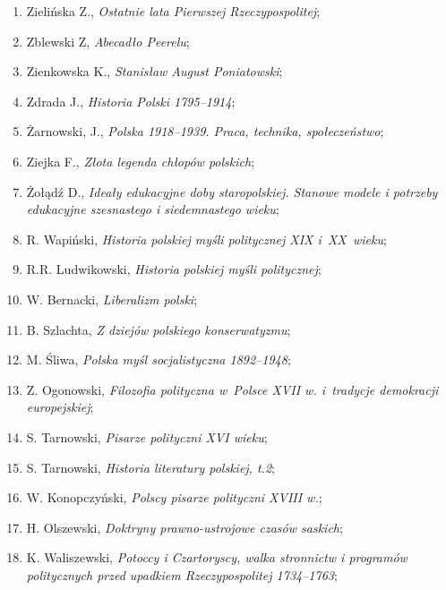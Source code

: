 \documentclass[a4paper,11pt]{article}
\begin{document}
\begin{enumerate}
\item Zielińska Z., \textit{Ostatnie lata Pierwszej Rzeczypospolitej};

\item Zblewski Z, \textit{Abecadło Peerelu};

\item Zienkowska K., \textit{Stanisław August Poniatowski};

\item Zdrada J., \textit{Historia Polski 1795--1914};

\item Żarnowski, J., \textit{Polska 1918--1939. Praca, technika,
    społeczeństwo};

\item Ziejka F., \textit{Złota legenda chłopów polskich};

\item Żołądź D., \textit{Ideały edukacyjne doby staropolskiej. Stanowe
    modele i potrzeby edukacyjne szesnastego i siedemnastego wieku};

\item R. Wapiński, \textit{Historia polskiej myśli politycznej XIX
    i~XX~wieku};

\item R.R. Ludwikowski, \textit{Historia polskiej myśli politycznej};

\item W. Bernacki, \textit{Liberalizm polski};

\item B. Szlachta, \textit{Z dziejów polskiego konserwatyzmu};

\item M. Śliwa, \textit{Polska myśl socjalistyczna 1892--1948};

\item Z. Ogonowski, \textit{Filozofia polityczna w~Polsce XVII w.
    i~tradycje demokracji europejskiej};

\item S. Tarnowski, \textit{Pisarze polityczni XVI wieku};

\item S. Tarnowski, \textit{Historia literatury polskiej, t.2};

\item W. Konopczyński, \textit{Polscy pisarze polityczni XVIII w.};

\item H. Olszewski, \textit{Doktryny prawno-ustrojowe czasów saskich};
\item K. Waliszewski, \textit{Potoccy i Czartoryscy, walka stronnictw i
    programów politycznych przed upadkiem Rzeczypospolitej 1734--1763};


\end{enumerate}
\end{document}
